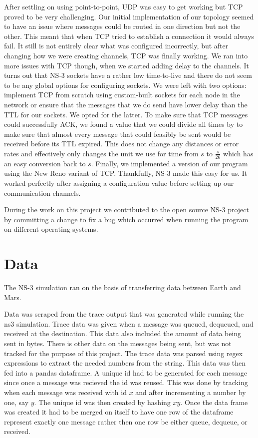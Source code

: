 \documentclass[a4paper,12pt]{article}
\begin{document}
After settling on using point-to-point, UDP was easy to get working but TCP
proved to be very challenging. Our initial implementation of our topology seemed
to have an issue where messages could be routed in one direction but not the
other. This meant that when TCP tried to establish a connection it would always
fail. It still is not entirely clear what was configured incorrectly, but after
changing how we were creating channels, TCP was finally working. We ran into
more issues with TCP though, when we started adding delay to the channels. It
turns out that NS-3 sockets have a rather low time-to-live and there do not seem
to be any global options for configuring sockets. We were left with two options:
implement TCP from scratch using custom-built sockets for each node in the
network or ensure that the messages that we do send have lower delay than the
TTL for our sockets. We opted for the latter. To make sure that TCP messages
could successfully ACK, we found a value that we could divide all times by to
make sure that almost every message that could feasibly be sent would be
received before its TTL expired. This does not change any distances or error
rates and effectively only changes the unit we use for time from $s$ to
$\frac{s}{26}$ which has an easy conversion back to $s$. Finally, we implemented
a version of our program using the New Reno variant of TCP. Thankfully, NS-3
made this easy for us. It worked perfectly after assigning a configuration value
before setting up our communication channels.

During the work on this project we contributed to the open source NS-3 project 
by committing a change to fix a bug which occurred when running the program on 
different operating systems.

\section{Data}
The NS-3 simulation ran on the basis of transferring data between Earth and 
Mars.

Data was scraped from the trace output that was generated while running the 
ns3 simulation. Trace data was given when a message was queued, dequeued, 
and received at the destination. This data also included the amount of 
data being sent in bytes. There is other data on the messages being sent, but 
was not tracked for the purpose of this project. The trace data was parsed 
using regex expressions to extract the needed numbers from the string.
This data was then fed into a pandas dataframe. A unique id had to be 
generated for each message since once a message was recieved the id was 
reused. This was done by tracking when each message was received with id 
$x$ and after incrementing a number by one, say $y$. The unique id was then 
created by hashing $xy$. Once the data frame was created it had to be merged 
on itself to have one row of the dataframe represent exactly one message rather 
then one row be either queue, dequeue, or received.
\end{document}
